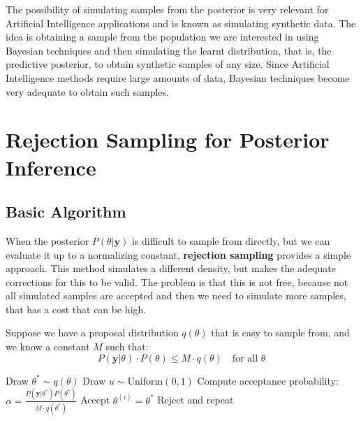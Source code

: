 The possibility of simulating samples from the posterior is very relevant for Artificial Intelligence applications and is known as simulating synthetic data. The idea is obtaining a sample from the population we are interested in using Bayesian techniques and then simulating the learnt distribution, that is, the predictive posterior, to obtain synthetic samples of any size. Since Artificial Intelligence methods require large amounts of data, Bayesian techniques become very adequate to obtain such samples.

\section{Rejection Sampling for Posterior Inference}

\subsection{Basic Algorithm}
When the posterior $P(\theta|\mathbf{y})$ is difficult to sample from directly, but we can evaluate it up to a normalizing constant, \textbf{rejection sampling} provides a simple approach. This method simulates a different density, but makes the adequate corrections for this to be valid. The problem is that this is not free, because not all simulated samples are accepted and then we need to simulate more samples, that has a cost that can be high.

Suppose we have a proposal distribution $q(\theta)$ that is easy to sample from, and we know a constant $M$ such that:
\begin{equation}
P(\mathbf{y}|\theta) \cdot P(\theta) \leq M \cdot q(\theta) \quad \text{for all } \theta
\end{equation}

\begin{algorithmbox}
\begin{algorithm}[H]
\caption{Rejection Sampling for Posterior}
\begin{algorithmic}[1]
    \State Draw $\theta^* \sim q(\theta)$ 
    \State Draw $u \sim \text{Uniform}(0, 1)$
    \State Compute acceptance probability: $\alpha = \frac{P(\mathbf{y}|\theta^*) P(\theta^*)}{M \cdot q(\theta^*)}$
        \State Accept $\theta^{(i)} = \theta^*$
    \Else
        \State Reject and repeat
    \EndIf
\EndFor
\end{algorithmic}
\end{algorithm}
\end{algorithmbox}

